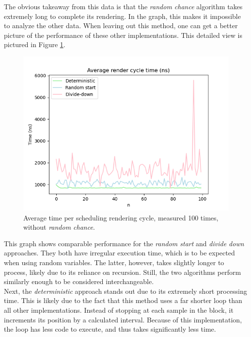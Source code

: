 \documentclass[10pt, twocolumn]{IEEEtran}
\begin{document}
The obvious takeaway from this data is that the \textit{random chance} algorithm takes extremely long to complete its rendering. In the graph, this makes it impossible to analyze the other data. When leaving out this method, one can get a better picture of the performance of these other implementations. This detailed view is pictured in Figure \ref{fig:scd_cycle_time_detail}.\pagebreak
\begin{figure}[ht!]
	\includegraphics[width=\linewidth]{scd_cycle_time_detail.png}
	\caption{Average time per scheduling rendering cycle, measured 100 times, without \textit{random chance}.}
	\label{fig:scd_cycle_time_detail}
\end{figure}

This graph shows comparable performance for the \textit{random start} and \textit{divide down} approaches. They both have irregular execution time, which is to be expected when using random variables. The latter, however, takes slightly longer to process, likely due to its reliance on recursion. Still, the two algorithms perform similarly enough to be considered interchangeable.\\
Next, the \textit{deterministic} approach stands out due to its extremely short processing time. This is likely due to the fact that this method uses a far shorter loop than all other implementations. Instead of stopping at each sample in the block, it increments its position by a calculated interval. Because of this implementation, the loop has less code to execute, and thus takes significantly less time.
\end{document}
